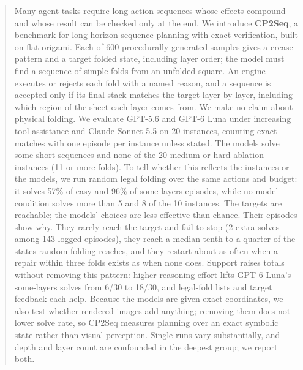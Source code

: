 \begin{abstract}
Many agent tasks require long action sequences whose effects compound and whose result can be
checked only at the end. We introduce \textbf{CP2Seq}, a benchmark for long-horizon sequence planning
with exact verification, built on flat origami. Each of 600 procedurally generated samples gives a
crease pattern and a target folded state, including layer order; the model must find a sequence of
simple folds from an unfolded square. An engine executes or rejects each fold with a named reason,
and a sequence is accepted only if its final stack matches the target layer by layer, including
which region of the sheet each layer comes from. We make no claim about physical folding. We
evaluate GPT-5.6 and GPT-6 Luna under increasing tool assistance and Claude Sonnet 5.5 on 20
instances, counting exact matches with one episode per instance unless stated. The models solve
some short sequences and none of the 20 medium or hard ablation instances (11 or more folds). To
tell whether this reflects the instances or the models, we run random legal folding over the same
actions and budget: it solves 57\% of easy and 96\% of some-layers episodes, while no model
condition solves more than 5 and 8 of the 10 instances. The targets are reachable; the models'
choices are less effective than chance. Their episodes show why. They rarely reach the target and
fail to stop (2 extra solves among 143 logged episodes), they reach a median tenth to a quarter of
the states random folding reaches, and they restart about as often when a repair within three
folds exists as when none does. Support raises totals without removing this pattern: higher
reasoning effort lifts GPT-6 Luna's some-layers solves from 6/30 to 18/30, and legal-fold lists
and target feedback each help. Because the models are given exact coordinates, we also test
whether rendered images add anything; removing them does not lower solve rate, so CP2Seq measures
planning over an exact symbolic state rather than visual perception. Single runs vary
substantially, and depth and layer count are confounded in the deepest group; we report both.
\end{abstract}
